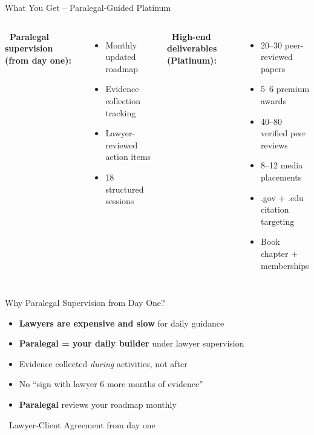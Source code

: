 \documentclass[aspectratio=169, 10pt]{beamer}
\begin{document}
	\begin{frame}{What You Get – Paralegal-Guided Platinum}
		\begin{columns}[T]
			\textbf{\faUserGraduate \ Paralegal supervision (from day one):}
			\begin{itemize}
				\item Monthly updated roadmap
				\item Evidence collection tracking
				\item Lawyer-reviewed action items
				\item 18 structured sessions
			\end{itemize}
			\textbf{\faGem \ High-end deliverables (Platinum):}
			\begin{itemize}
				\item 20–30 peer-reviewed papers
				\item 5–6 premium awards
				\item 40–80 verified peer reviews
				\item 8–12 media placements
				\item .gov + .edu citation targeting
				\item Book chapter + memberships
			\end{itemize}
		\end{columns}
	\end{frame}
	
	\begin{frame}{Why Paralegal Supervision from Day One?}
		\begin{itemize}
			\item \textbf{Lawyers are expensive and slow} for daily guidance
			\item \textbf{Paralegal = your daily builder} under lawyer supervision
			\item Evidence collected \textit{during} activities, not after
			\item No “sign with lawyer  6 more months of evidence”
			\item \textbf{Paralegal} reviews your roadmap monthly
		\end{itemize}
		
		\vspace{0.5cm}
		\centering
		\textcolor{navyblue}{\Large \faGavel \  Lawyer-Client Agreement from day one}
	\end{frame}
	
\end{document}
